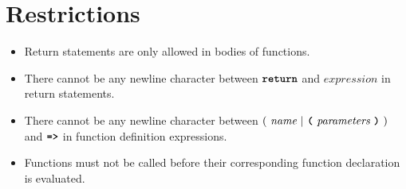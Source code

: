 \section*{Restrictions}

\begin{itemize}
\item Return statements are only allowed in bodies of functions.
\item There cannot be any newline character between
$\textbf{\texttt{return}}$ and $\textit{expression}$ in return statements.
\item There cannot be any newline character between
  $(\ \textit{name}\ | \ \textbf{\texttt{(}}\ \textit{parameters}\ \textbf{\texttt{)}}\ )$
                                               and
$\texttt{\textbf{=>}}$ in function definition expressions.
\item Functions must not be called before their corresponding function declaration
   is evaluated.
\end{itemize}
